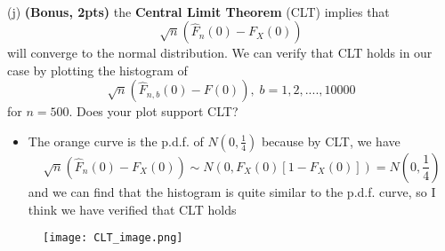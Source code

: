 \documentclass[11pt, oneside]{article}   	%
\begin{document}
\paragraph{}
(j) \textbf{(Bonus, 2pts)} the \textbf{Central Limit Theorem} (CLT) implies that 
\[
\sqrt{n}(\hat{F}_{n}(0) - F_X(0)) 
\]
will converge to the normal distribution. We can verify that CLT holds in our case by plotting the histogram of 
\[
\sqrt{n}(\hat{F}_{n,b}(0) - F(0)), \; b = 1,2, ...., 10000
\]
for $n=500$. Does your plot support CLT?

\begin{itemize}
    \item [] The orange curve is the p.d.f. of $N(0,\frac{1}{4})$ because by CLT, we have
    \[
    \sqrt{n}(\hat{F}_{n}(0) - F_X(0)) \sim N(0, F_X(0)[1-F_X(0)]) = N(0, \frac{1}{4})
    \]
    and we can find that the histogram is quite similar to the p.d.f. curve, so I think we have verified that CLT holds
\end{itemize}
\begin{figure}[htbp]
	\centering
	\texttt{[image: CLT\_image.png]}
	\label{fig:CLT}
\end{figure}
\end{document}
